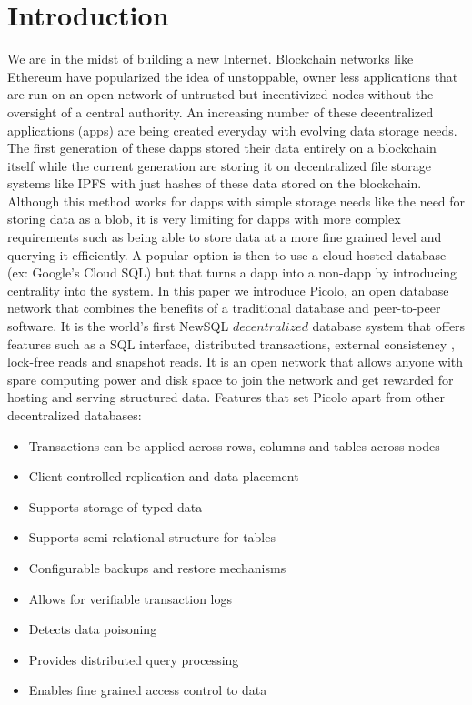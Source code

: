 \documentclass[preprint,10pt]{elsarticle}
\theoremstyle{definition}
\begin{document}
\section{Introduction}\label{Sect:Introduction}
We are in the midst of building a new Internet. Blockchain networks like Ethereum have popularized the idea of unstoppable, owner less applications that are run on an open network of untrusted but incentivized nodes without the oversight of a central authority. An increasing number of these decentralized applications (\DJ apps) are being created everyday with evolving data storage needs. The first generation of these dapps stored their data entirely on a blockchain itself while the current generation are storing it on decentralized file storage systems like IPFS with just hashes of these data stored on the blockchain. Although this method works for dapps with simple storage needs like the need for storing data as a blob, it is very limiting for dapps with more complex requirements such as being able to store data at a more fine grained level and querying it efficiently. A popular option is then to use a cloud hosted database (ex: Google’s Cloud SQL) but that turns a dapp into a non-dapp by introducing centrality into the system. \newline\newline
In this paper we introduce Picolo, an open database network that combines the benefits of a traditional database and peer-to-peer software. It is the world's first NewSQL $decentralized$ database system that offers features such as a SQL interface, distributed transactions, external consistency \cite{External_Consistency}, lock-free reads and snapshot reads. It is an open network that allows anyone with spare computing power and disk space to join the network and get rewarded for hosting and serving structured data.
\newline\newline
Features that set Picolo apart from other decentralized databases:
\begin{itemize}
	\item Transactions can be applied across rows, columns and tables across nodes
	\item Client controlled replication and data placement
	\item Supports storage of typed data
	\item Supports semi-relational structure for tables
	\item Configurable backups and restore mechanisms
	\item Allows for verifiable transaction logs
	\item Detects data poisoning
	\item Provides distributed query processing
	\item Enables fine grained access control to data
	\newline
\end{itemize}
\end{document}
